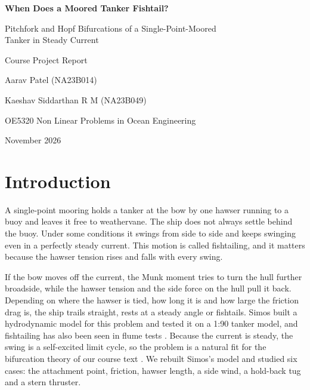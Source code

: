 \documentclass[11pt,a4paper]{article}
\begin{document}
\begin{titlepage}
\centering
\vspace*{4cm}
{\LARGE\bfseries When Does a Moored Tanker Fishtail?\par}
\vspace{0.6cm}
{\Large Pitchfork and Hopf Bifurcations of a Single-Point-Moored\\[2pt] Tanker in Steady Current\par}
\vspace{2.5cm}
{\large Course Project Report\par}
\vspace{2.5cm}
{\large Aarav Patel (NA23B014)\par}
\vspace{0.25cm}
{\large Kaeshav Siddarthan R M (NA23B049)\par}
\vfill
{\large OE5320 Non Linear Problems in Ocean Engineering\par}
\vspace{0.3cm}
{\large November 2026\par}
\vspace*{2cm}
\end{titlepage}

\tableofcontents
\clearpage
{}

\section{Introduction}
A single-point mooring holds a tanker at the bow by one hawser running to a buoy and leaves it free to weathervane. The
ship does not always settle behind the buoy. Under some conditions it swings from side to side and keeps swinging even
in a perfectly steady current. This motion is called fishtailing, and it matters because the hawser tension rises and
falls with every swing.

If the bow moves off the current, the Munk moment tries to turn the hull further broadside, while the hawser tension and
the side force on the hull pull it back. Depending on where the hawser is tied, how long it is and how large the
friction drag is, the ship trails straight, rests at a steady angle or fishtails. Simos \cite{simos} built a
hydrodynamic model for this problem and tested it on a 1:90 tanker model, and fishtailing has also been seen in flume
tests \cite{aghamohammadi}. Because the current is steady, the swing is a self-excited limit cycle, so the problem is a
natural fit for the bifurcation theory of our course text \cite{strogatz}. We rebuilt Simos's model and studied six
cases: the attachment point, friction, hawser length, a side wind, a hold-back tug and a stern thruster.
\end{document}
